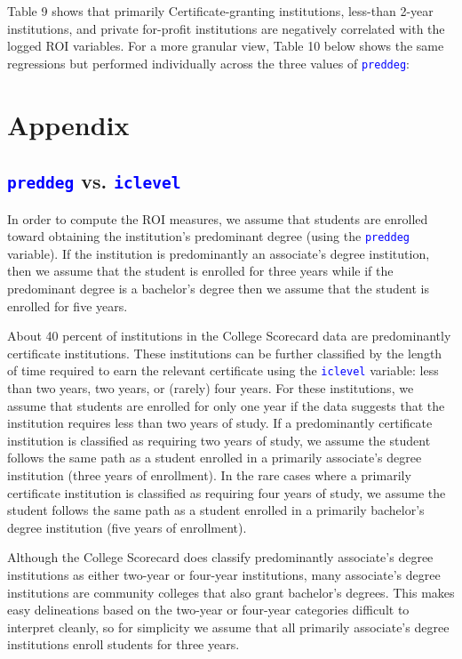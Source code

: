 \documentclass[12pt]{article}
\numberwithin{equation}{section}
\newcommand{\Varnm}[1]{\texttt{\textcolor{Blue}{#1}}}
\begin{document}


\newpage
Table 9 shows that primarily Certificate-granting institutions, less-than 2-year institutions, and private for-profit institutions are negatively correlated with the logged ROI variables. For a more granular view, Table 10 below shows the same regressions but performed individually across the three values of \Varnm{preddeg}:



\newpage
\section{Appendix}

\subsection{\Varnm{preddeg} vs. \Varnm{iclevel}}
In order to compute the ROI measures, we assume that students are enrolled toward obtaining the institution's predominant degree (using the \Varnm{preddeg} variable). If the institution is predominantly an associate’s degree institution, then we assume that the student is enrolled for three years while if the predominant degree is a bachelor’s degree then we assume that the student is enrolled for five years.

About 40 percent of institutions in the College Scorecard data are predominantly certificate institutions. These institutions can be further classified by the length of time required to earn the relevant certificate using the \Varnm{iclevel} variable: less than two years, two years, or (rarely) four years. For these institutions, we assume that students are enrolled for only one year if the data suggests that the institution requires less than two years of study. If a predominantly certificate institution is classified as requiring two years of study, we assume the student follows the same path as a student enrolled in a primarily associate’s degree institution (three years of enrollment). In the rare cases where a primarily certificate institution is classified as requiring four years of study, we assume the student follows the same path as a student enrolled in a primarily bachelor’s degree institution (five years of enrollment).

Although the College Scorecard does classify predominantly associate’s degree institutions as either two-year or four-year institutions, many associate’s degree institutions are community colleges that also grant bachelor’s degrees. This makes easy delineations based on the two-year or four-year categories difficult to interpret cleanly, so for simplicity we assume that all primarily associate’s degree institutions enroll students for three years.
\end{document}
